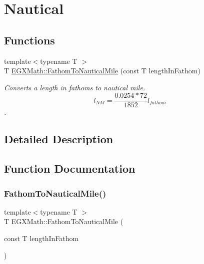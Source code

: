 \hypertarget{group___e_g_x_math-_conversions-_length_conversions-_imperial-_fathom-_nautical}{}\section{Nautical}
\label{group___e_g_x_math-_conversions-_length_conversions-_imperial-_fathom-_nautical}
\subsection*{Functions}
\begin{DoxyCompactItemize}
\item 
{\footnotesize template$<$typename T $>$ }\\T \mbox{\hyperlink{group___e_g_x_math-_conversions-_length_conversions-_imperial-_fathom-_nautical_gad39e9317e15dc0e98e3a00cf83939df7}{E\+G\+X\+Math\+::\+Fathom\+To\+Nautical\+Mile}} (const T length\+In\+Fathom)
\begin{DoxyCompactList}\small\item\em Converts a length in fathoms to nautical mile. \[ l_{NM}= \frac{0.0254 * 72}{1852} l_{fathom} \]. \end{DoxyCompactList}\end{DoxyCompactItemize}


\subsection{Detailed Description}


\subsection{Function Documentation}
\mbox{\label{group___e_g_x_math-_conversions-_length_conversions-_imperial-_fathom-_nautical_gad39e9317e15dc0e98e3a00cf83939df7}} 
\subsubsection{\texorpdfstring{Fathom\+To\+Nautical\+Mile()}{FathomToNauticalMile()}}
{\footnotesize\ttfamily template$<$typename T $>$ \\
T E\+G\+X\+Math\+::\+Fathom\+To\+Nautical\+Mile (\begin{DoxyParamCaption}\item[{const T}]{length\+In\+Fathom }\end{DoxyParamCaption})}



